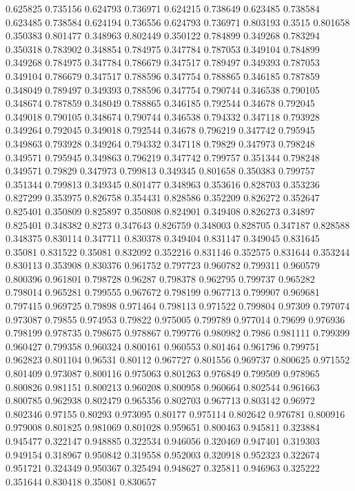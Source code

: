 0.625825 0.735156
0.624793 0.736971
0.624215 0.738649
0.623485 0.738584
0.623485 0.738584
0.624194 0.736556
0.624793 0.736971
0.803193 0.3515
0.801658 0.350383
0.801477 0.348963
0.802449 0.350122
0.784899 0.349268
0.783294 0.350318
0.783902 0.348854
0.784975 0.347784
0.787053 0.349104
0.784899 0.349268
0.784975 0.347784
0.786679 0.347517
0.789497 0.349393
0.787053 0.349104
0.786679 0.347517
0.788596 0.347754
0.788865 0.346185
0.787859 0.348049
0.789497 0.349393
0.788596 0.347754
0.790744 0.346538
0.790105 0.348674
0.787859 0.348049
0.788865 0.346185
0.792544 0.34678
0.792045 0.349018
0.790105 0.348674
0.790744 0.346538
0.794332 0.347118
0.793928 0.349264
0.792045 0.349018
0.792544 0.34678
0.796219 0.347742
0.795945 0.349863
0.793928 0.349264
0.794332 0.347118
0.79829 0.347973
0.798248 0.349571
0.795945 0.349863
0.796219 0.347742
0.799757 0.351344
0.798248 0.349571
0.79829 0.347973
0.799813 0.349345
0.801658 0.350383
0.799757 0.351344
0.799813 0.349345
0.801477 0.348963
0.353616 0.828703
0.353236 0.827299
0.353975 0.826758
0.354431 0.828586
0.352209 0.826272
0.352647 0.825401
0.350809 0.825897
0.350808 0.824901
0.349408 0.826273
0.34897 0.825401
0.348382 0.8273
0.347643 0.826759
0.348003 0.828705
0.347187 0.828588
0.348375 0.830114
0.347711 0.830378
0.349404 0.831147
0.349045 0.831645
0.35081 0.831522
0.35081 0.832092
0.352216 0.831146
0.352575 0.831644
0.353244 0.830113
0.353908 0.830376
0.961752 0.797723
0.960782 0.799311
0.960579 0.800396
0.961801 0.798728
0.96287 0.798378
0.962795 0.799737
0.965282 0.798014
0.965281 0.799555
0.967672 0.798199
0.967713 0.799907
0.969681 0.797415
0.969725 0.79898
0.971464 0.798113
0.971522 0.799804
0.97309 0.797074
0.973087 0.79855
0.974953 0.79822
0.975005 0.799789
0.977014 0.79699
0.976936 0.798199
0.978735 0.798675
0.978867 0.799776
0.980982 0.7986
0.981111 0.799399
0.960427 0.799358
0.960324 0.800161
0.960553 0.801464
0.961796 0.799751
0.962823 0.801104
0.96531 0.80112
0.967727 0.801556
0.969737 0.800625
0.971552 0.801409
0.973087 0.800116
0.975063 0.801263
0.976849 0.799509
0.978965 0.800826
0.981151 0.800213
0.960208 0.800958
0.960664 0.802544
0.961663 0.800785
0.962938 0.802479
0.965356 0.802703
0.967713 0.803142
0.96972 0.802346
0.97155 0.80293
0.973095 0.80177
0.975114 0.802642
0.976781 0.800916
0.979008 0.801825
0.981069 0.801028
0.959651 0.800463
0.945811 0.323884
0.945477 0.322147
0.948885 0.322534
0.946056 0.320469
0.947401 0.319303
0.949154 0.318967
0.950842 0.319558
0.952003 0.320918
0.952323 0.322674
0.951721 0.324349
0.950367 0.325494
0.948627 0.325811
0.946963 0.325222
0.351644 0.830418
0.35081 0.830657
